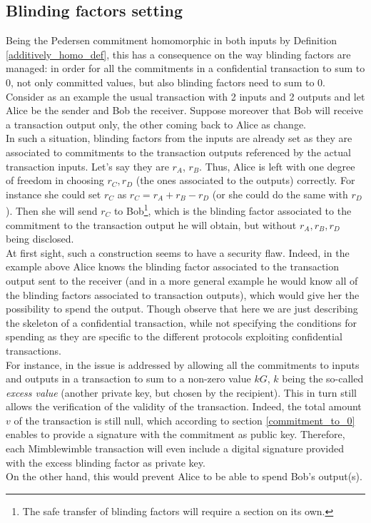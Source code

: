\subsection{Blinding factors setting}
Being the Pedersen commitment homomorphic in both inputs by Definition \ref{additively_homo_def}, this has a consequence on the way blinding factors are managed: in order for all the commitments in a confidential transaction to sum to 0, not only committed values, but also blinding factors need to sum to 0.\\
Consider as an example the usual transaction with 2 inputs and 2 outputs and let Alice be the sender and Bob the receiver. Suppose moreover that Bob will receive a transaction output only, the other coming back to Alice as change.\\
In such a situation, blinding factors from the inputs are already set as they are associated to commitments to the transaction outputs referenced by the actual transaction inputs. Let's say they are $r_A$, $r_B$. Thus, Alice is left with one degree of freedom in choosing $r_C, r_D$ (the ones associated to the outputs) correctly. For instance she could set $r_C$ as $r_C = r_A + r_B - r_D$ (or she could do the same with $r_D$). Then she will send $r_C$ to Bob\footnote{The safe transfer of blinding factors will require a section on its own.}, which is the blinding factor associated to the commitment to the transaction output he will obtain, but without $r_A, r_B, r_D$ being disclosed.\\
At first sight, such a construction seems to have a security flaw. Indeed, in the example above Alice knows the blinding factor associated to the transaction output sent to the receiver (and in a more general example he would know all of the blinding factors associated to transaction outputs), which would give her the possibility to spend the output. Though observe that here we are just describing the skeleton of a confidential transaction, while not specifying the conditions for spending as they are specific to the different protocols exploiting confidential transactions.\\
For instance, in \cite{MW} the issue is addressed by allowing all the commitments to inputs and outputs in a transaction to sum to a non-zero value $kG$, $k$ being the so-called \textit{excess value} (another private key, but chosen by the recipient). This in turn still allows the verification of the validity of the transaction. Indeed, the total amount $v$ of the transaction is still null, which according to section \ref{commitment_to_0} enables to provide a signature with the commitment as public key. Therefore, each Mimblewimble transaction will even include a digital signature provided with the excess blinding factor as private key.\\
On the other hand, this would prevent Alice to be able to spend Bob's output(s).

